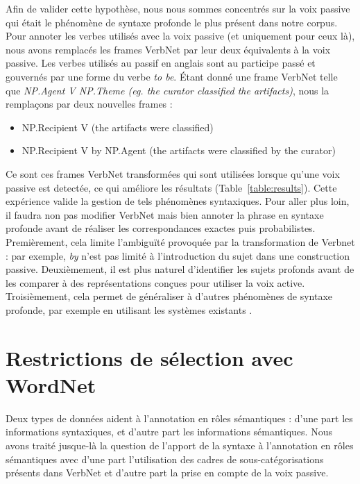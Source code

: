 Afin de valider cette hypothèse, nous nous sommes concentrés sur la voix
passive qui était le phénomène de syntaxe profonde le plus présent dans notre
corpus.  Pour annoter les verbes utilisés avec la voix passive (et uniquement
pour ceux là), nous avons remplacés les frames VerbNet par leur deux
équivalents à la voix passive. Les verbes utilisés au passif en anglais sont au
participe passé et gouvernés par une forme du verbe \emph{to be}. Étant donné
une frame VerbNet telle que \emph{NP.Agent V NP.Theme (eg. the
curator classified the artifacts)}, nous la remplaçons par deux nouvelles
frames :

\begin{itemize}
    \item NP.Recipient V (the artifacts were classified)
    \item NP.Recipient V by NP.Agent (the artifacts were classified by the curator)
\end{itemize}

Ce sont ces frames VerbNet transformées qui sont utilisées lorsque qu'une voix
passive est detectée, ce qui améliore les résultats
(Table~\ref{table:results}). Cette expérience valide la gestion de tels
phénomènes syntaxiques. Pour aller plus loin, il faudra non pas modifier
VerbNet mais bien annoter la phrase en syntaxe profonde avant de réaliser les
correspondances exactes puis probabilistes. Premièrement, cela limite
l'ambiguïté provoquée par la transformation de Verbnet : par exemple, \emph{by}
n'est pas limité à l'introduction du sujet dans une construction passive.
Deuxièmement, il est plus naturel d'identifier les sujets profonds avant de les
comparer à des représentations conçues pour utiliser la voix active.
Troisièmement, cela permet de généraliser à d'autres phénomènes de syntaxe
profonde, par exemple en utilisant les systèmes existants
\citep{bonfante2011modular,ribeyre2013systeme}.

\section{Restrictions de sélection avec WordNet}
\label{restrictions_selection}

Deux types de données aident à l'annotation en rôles sémantiques : d'une part
les informations syntaxiques, et d'autre part les informations sémantiques.
Nous avons traité jusque-là la question de l'apport de la syntaxe à
l'annotation en rôles sémantiques avec d'une part l'utilisation des cadres de
sous-catégorisations présents dans VerbNet et d'autre part la prise en compte
de la voix passive.

